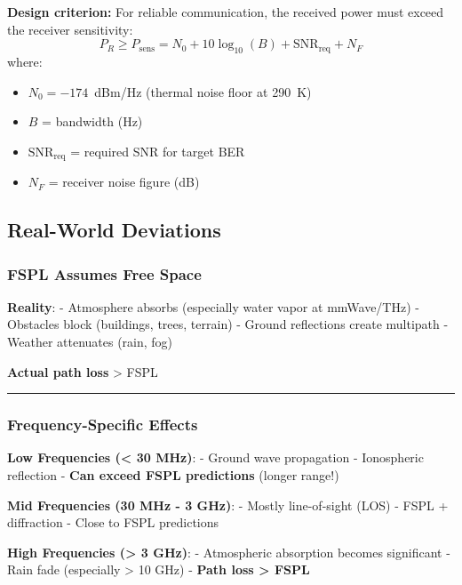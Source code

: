 \textbf{Design criterion:} For reliable communication, the received power must exceed the receiver sensitivity:
\begin{equation}
P_R \geq P_{\text{sens}} = N_0 + 10\log_{10}(B) + \text{SNR}_{\text{req}} + N_F
\end{equation}
where:
\begin{itemize}
\item $N_0 = -174$~dBm/Hz (thermal noise floor at 290~K)
\item $B$ = bandwidth (Hz)
\item $\text{SNR}_{\text{req}}$ = required SNR for target BER
\item $N_F$ = receiver noise figure (dB)
\end{itemize}

\subsection{\texorpdfstring{ Real-World
Deviations}{ Real-World Deviations}}\label{real-world-deviations}

\subsubsection{FSPL Assumes Free Space}\label{fspl-assumes-free-space}

\textbf{Reality}: - Atmosphere absorbs (especially water vapor at
mmWave/THz) - Obstacles block (buildings, trees, terrain) - Ground
reflections create multipath - Weather attenuates (rain, fog)

\textbf{Actual path loss} \textgreater{} FSPL

\begin{center}\rule{0.5\linewidth}{0.5pt}\end{center}

\subsubsection{Frequency-Specific
Effects}\label{frequency-specific-effects}

\textbf{Low Frequencies (\textless{} 30 MHz)}: - Ground wave propagation
- Ionospheric reflection - \textbf{Can exceed FSPL predictions} (longer
range!)

\textbf{Mid Frequencies (30 MHz - 3 GHz)}: - Mostly line-of-sight (LOS)
- FSPL + diffraction - Close to FSPL predictions

\textbf{High Frequencies (\textgreater{} 3 GHz)}: - Atmospheric
absorption becomes significant - Rain fade (especially \textgreater{} 10
GHz) - \textbf{Path loss \textgreater{} FSPL}

